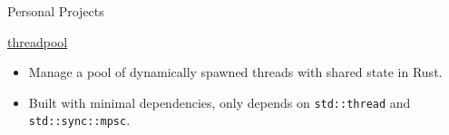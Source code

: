 \documentclass{article}
\newlength{\tabin}
\newlength{\secsep}
\newcommand{\lineunder}{\vspace*{-8pt} \\ \hspace*{-6pt} \hrulefill \\ \vspace*{-15pt}}
\newenvironment{tabbedsection}[1]{
  \begin{list}{}{
      \setlength{\itemsep}{0pt}
      \setlength{\labelsep}{0pt}
      \setlength{\labelwidth}{0pt}
      \setlength{\leftmargin}{\tabin}
      \setlength{\rightmargin}{\tabin}
      \setlength{\listparindent}{0pt}
      \setlength{\parsep}{0pt}
      \setlength{\parskip}{0pt}
      \setlength{\partopsep}{0pt}
      \setlength{\topsep}{#1}
    }
  \item[]
}{\end{list}}
\newenvironment{resume_section}[1]{
  \filbreak
  \vspace{2\secsep}
  \textsc{\large#1}
  \lineunder
  \begin{tabbedsection}{\secsep}
}{\end{tabbedsection}}
\newenvironment{resume_subsection}[2][]{
  \textbf{#2} \hfill {\footnotesize #1} \hspace{2em}
  \begin{tabbedsection}{0.5\secsep}
}{\end{tabbedsection}}
\newenvironment{subitems}{
  \renewcommand{\labelitemi}{-}
  \begin{itemize}
      \setlength{\labelsep}{1em}
}{\end{itemize}}
\begin{document}
\begin{resume_section}{Personal Projects}
  \begin{resume_subsection}[(April 2023)]{\href{https://github.com/marcustut/threadpool}{threadpool}}
    \begin{subitems}
      \item Manage a pool of dynamically spawned threads with shared state in Rust.
      \item Built with minimal dependencies, only depends on \texttt{std::thread} and \texttt{std::sync::mpsc}.
    \end{subitems}
  \end{resume_subsection}





\end{resume_section}
\end{document}
